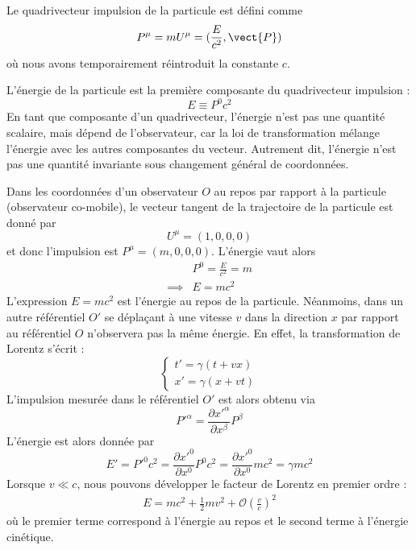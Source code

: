 \begin{theoremframe}
    \begin{defi}
        Le quadrivecteur impulsion de la particule est défini comme
        \begin{equation}
            P^{\mu} = mU^{\mu} = (\frac{E}{c^2}, \vect{P})
        \end{equation}
        où nous avons temporairement réintroduit la constante $c$.
        \end{defi}
\end{theoremframe}
L’énergie de la particule est la première composante du quadrivecteur impulsion :
\begin{equation}
    E \equiv P^{0} c^2
\end{equation}
En tant que composante d'un quadrivecteur, l'énergie n'est pas une quantité scalaire, mais dépend de l'observateur, car la loi de transformation mélange l'énergie avec les autres composantes du vecteur. Autrement dit, l'énergie n'est pas une quantité invariante sous changement général de coordonnées. 
\begin{exmp}
    Dans les coordonnées d'un observateur $O$ au repos par rapport à la particule (observateur co-mobile), le vecteur tangent de la trajectoire de la particule est donné par
    \begin{equation}
        U^{\mu} = (1,0,0,0)
    \end{equation}
    et donc l'impulsion est $P^{\mu} = (m,0,0,0)$. L'énergie vaut alors
    \begin{align}
        &P^0 = \frac{E}{c^2}=m\\
        \implies &E = mc^2
    \end{align}
    L'expression $E = mc^2$ est l'énergie au repos de la particule. Néanmoins, dans un autre référentiel $O'$ se déplaçant à une vitesse $v$ dans la direction $x$ par rapport au référentiel $O$ n'observera pas la même énergie. En effet, la transformation de Lorentz s'écrit :
    \begin{equation}
        \left\{
        \begin{array}{l}
            t' = \gamma (t + vx)\\
            x' = \gamma (x + vt)
        \end{array}
        \right.
    \end{equation}
    L'impulsion mesurée dans le référentiel $O'$ est alors obtenu via 
    \begin{equation}
        P'^{\alpha} = \frac{\partial x'^{\alpha}}{\partial x^{\beta}} P^{\beta}
    \end{equation}
    L'énergie est alors donnée par
    \begin{equation}
        E' = P'^{0}c^2 = \frac{\partial x'^{0}}{\partial x^{0}} P^{0}c^2 = \frac{\partial x'^{0}}{\partial x^{0}}m c^2= \gamma m c^2
    \end{equation}
    Lorsque $v\ll c$, nous pouvons développer le facteur de Lorentz en premier ordre :
    \begin{align}    
        E = mc^2 + \frac{1}{2}mv^2 + \mathcal{O}\left(\frac{v}{c}\right)^2
    \end{align}
    où le premier terme correspond à l'énergie au repos et le second terme à l'énergie cinétique. 
\end{exmp}
